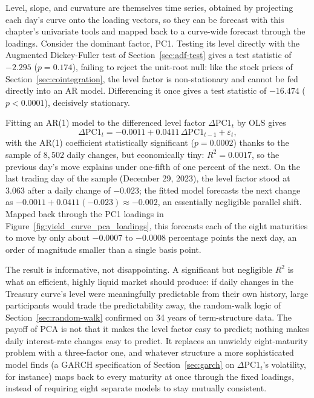 \documentclass[../ai_in_finance]{subfiles}
\begin{document}
Level, slope, and curvature are themselves time series, obtained by projecting each day's curve onto the loading vectors, so they can be forecast with this chapter's univariate tools and mapped back to a curve-wide forecast through the loadings. Consider the dominant factor, PC1. Testing its level directly with the Augmented Dickey-Fuller test of Section~\ref{sec:adf-test} gives a test statistic of $-2.295$ ($p = 0.174$), failing to reject the unit-root null: like the stock prices of Section~\ref{sec:cointegration}, the level factor is non-stationary and cannot be fed directly into an AR model.
Differencing it once gives a test statistic of $-16.474$ ($p < 0.0001$), decisively stationary.

Fitting an AR(1) model to the differenced level factor $\Delta\text{PC1}_t$ by OLS gives
\begin{equation*}
\Delta\text{PC1}_t = -0.0011 + 0.0411\,\Delta\text{PC1}_{t-1} + \varepsilon_t,
\end{equation*}
with the AR(1) coefficient statistically significant ($p = 0.0002$) thanks to the sample of $8{,}502$ daily changes, but economically tiny: $R^2 = 0.0017$, so the previous day's move explains under one-fifth of one percent of the next.
On the last trading day of the sample (December 29, 2023), the level factor stood at $3.063$ after a daily change of $-0.023$; the fitted model forecasts the next change as $-0.0011 + 0.0411(-0.023) \approx -0.002$, an essentially negligible parallel shift. Mapped back through the PC1 loadings in Figure~\ref{fig:yield_curve_pca_loadings}, this forecasts each of the eight maturities to move by only about $-0.0007$ to $-0.0008$ percentage points the next day, an order of magnitude smaller than a single basis point.

The result is informative, not disappointing. A significant but negligible $R^2$ is what an efficient, highly liquid market should produce: if daily changes in the Treasury curve's level were meaningfully predictable from their own history, large participants would trade the predictability away, the random-walk logic of Section~\ref{sec:random-walk} confirmed on 34 years of term-structure data.
The payoff of PCA is not that it makes the level factor easy to predict; nothing makes daily interest-rate changes easy to predict. It replaces an unwieldy eight-maturity problem with a three-factor one, and whatever structure a more sophisticated model finds (a GARCH specification of Section~\ref{sec:garch} on $\Delta\text{PC1}_t$'s volatility, for instance) maps back to every maturity at once through the fixed loadings, instead of requiring eight separate models to stay mutually consistent.
\end{document}
